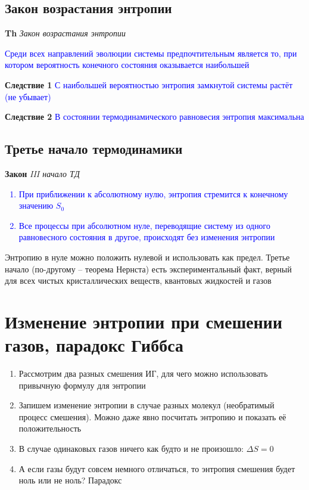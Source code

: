 \documentclass[a4paper, 14pt]{article}
\begin{document}
    \subsection{Закон возрастания энтропии}
    
    \textbf{Th} \textit{Закон возрастания энтропии}
    
    \textcolor{blue}{Среди всех направлений эволюции системы предпочтительным является то, при котором вероятность
    конечного состояния оказывается наибольшей}
    
    \textbf{Следствие 1} \textcolor{blue}{С наибольшей вероятностью энтропия замкнутой системы растёт (не убывает)}
    
    \textbf{Следствие 2} \textcolor{blue}{В состоянии термодинамического равновесия энтропия максимальна}
    
    \subsection{Третье начало термодинамики}
    
    \textbf{Закон} \textit{III начало ТД}
    \textcolor{blue}{
        \begin{enumerate}
            \item При приближении к абсолютному нулю, энтропия стремится к конечному значению $S_0$
            \item Все процессы при абсолютном нуле, переводящие систему из одного равновесного состояния
            в другое, происходят без изменения энтропии
        \end{enumerate}}
    
    Энтропию в нуле можно положить нулевой и использовать как предел.
    Третье начало (по-другому -- теорема Нернста) есть экспериментальный факт, верный для всех чистых кристаллических
    веществ, квантовых жидкостей и газов
    
    \section{Изменение энтропии при смешении газов, парадокс Гиббса}
    
    \begin{enumerate}
        \item Рассмотрим два разных смешения ИГ, для чего можно использовать привычную формулу для энтропии
        \item Запишем изменение энтропии в случае разных молекул (необратимый процесс смешения).
        Можно даже явно посчитать энтропию и показать её положительность
        \item В случае одинаковых газов ничего как будто и не произошло: $\Delta S = 0$
        \item А если газы будут совсем немного отличаться, то энтропия смешения будет ноль или не ноль?
        Парадокс
    \end{enumerate}
    
\end{document}
